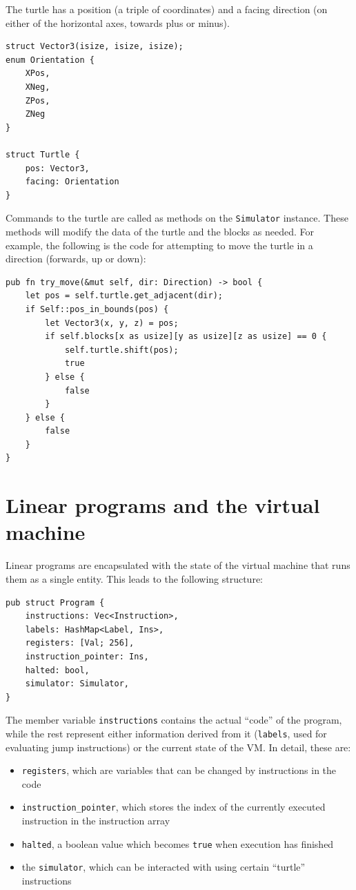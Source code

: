 \documentclass{report}
\begin{document}
The turtle has a position (a triple of coordinates) and a facing direction (on either of the horizontal axes, towards plus or minus).
\begin{verbatim}
struct Vector3(isize, isize, isize);
enum Orientation {
    XPos,
    XNeg,
    ZPos,
    ZNeg
}

struct Turtle {
    pos: Vector3,
    facing: Orientation
}
\end{verbatim}

Commands to the turtle are called as methods on the \verb|Simulator| instance. These methods will modify the data of the turtle and the blocks as needed. For example, the following is the code for attempting to move the turtle in a direction (forwards, up or down):

\begin{verbatim}
pub fn try_move(&mut self, dir: Direction) -> bool {
    let pos = self.turtle.get_adjacent(dir);
    if Self::pos_in_bounds(pos) {
        let Vector3(x, y, z) = pos;
        if self.blocks[x as usize][y as usize][z as usize] == 0 {
            self.turtle.shift(pos);
            true
        } else {
            false
        }
    } else {
        false
    }
}
\end{verbatim}

\section{Linear programs and the virtual machine}
Linear programs are encapsulated with the state of the virtual machine that runs them as a single entity. This leads to the following structure:

\begin{verbatim}
pub struct Program {
    instructions: Vec<Instruction>,
    labels: HashMap<Label, Ins>,
    registers: [Val; 256],
    instruction_pointer: Ins,
    halted: bool,
    simulator: Simulator,
}
\end{verbatim}

The member variable \verb|instructions| contains the actual ``code'' of the program, while the rest represent either information derived from it (\verb|labels|, used for evaluating jump instructions) or the current state of the VM. In detail, these are:

\begin{itemize}
    \item \verb|registers|, which are variables that can be changed by instructions in the code
    \item \verb|instruction_pointer|, which stores the index of the currently executed instruction in the instruction array
    \item \verb|halted|, a boolean value which becomes \verb|true| when execution has finished
    \item the \verb|simulator|, which can be interacted with using certain ``turtle'' instructions
\end{itemize}
\end{document}
